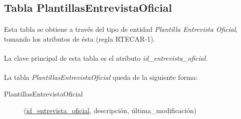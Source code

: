   \subsection{Tabla PlantillasEntrevistaOficial}

      \paragraph{}Esta tabla se obtiene a través del tipo de entidad
      \textit{Plantilla Entrevista Oficial}, tomando los atributos de ésta
      (regla RTECAR-1).

      \paragraph{}La clave principal de esta tabla es el atributo
      \textit{id\_entrevista\_oficial}.

      \paragraph{}La tabla \textit{PlantillasEntrevistaOficial} queda de la
      siguiente forma:

      \begin{description}
         \item[PlantillasEntrevistaOficial] \begin{flushleft}(\underline{id\_entrevista\_oficial}, descripción,
         última\_modificación)\end{flushleft}
      \end{description}
